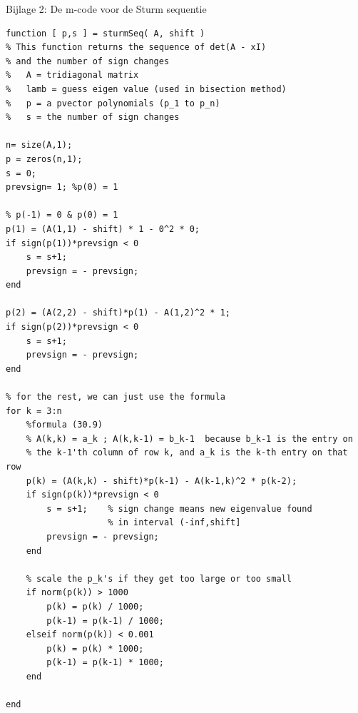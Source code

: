 \documentclass[]{article}
\begin{document}
\pagebreak
Bijlage 2: De m-code voor de Sturm sequentie
\begin{framed}
\begin{lstlisting}
function [ p,s ] = sturmSeq( A, shift )
% This function returns the sequence of det(A - xI) 
% and the number of sign changes
%   A = tridiagonal matrix
%   lamb = guess eigen value (used in bisection method)
%   p = a pvector polynomials (p_1 to p_n)
%   s = the number of sign changes

n= size(A,1);
p = zeros(n,1);
s = 0; 
prevsign= 1; %p(0) = 1

% p(-1) = 0 & p(0) = 1
p(1) = (A(1,1) - shift) * 1 - 0^2 * 0;  
if sign(p(1))*prevsign < 0
    s = s+1; 
    prevsign = - prevsign;
end

p(2) = (A(2,2) - shift)*p(1) - A(1,2)^2 * 1;
if sign(p(2))*prevsign < 0
    s = s+1; 
    prevsign = - prevsign;
end

% for the rest, we can just use the formula
for k = 3:n
	%formula (30.9)
    % A(k,k) = a_k ; A(k,k-1) = b_k-1  because b_k-1 is the entry on 
    % the k-1'th column of row k, and a_k is the k-th entry on that row 
    p(k) = (A(k,k) - shift)*p(k-1) - A(k-1,k)^2 * p(k-2);
    if sign(p(k))*prevsign < 0 
        s = s+1; 	% sign change means new eigenvalue found 
        			% in interval (-inf,shift]
        prevsign = - prevsign;
    end
    
    % scale the p_k's if they get too large or too small
    if norm(p(k)) > 1000
        p(k) = p(k) / 1000;
        p(k-1) = p(k-1) / 1000;
    elseif norm(p(k)) < 0.001
        p(k) = p(k) * 1000;
        p(k-1) = p(k-1) * 1000;
    end
    
end
\end{lstlisting}
\end{framed}
\end{document}
